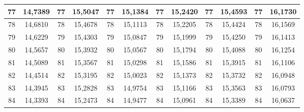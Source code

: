 \documentclass[a4paper,12pt]{article} %
\begin{document}
\begin{longtable}[c]{cccccccccc|c|c|}
	\multicolumn{1}{|c|}{77} & \multicolumn{1}{c|}{14,7389} & \multicolumn{1}{c|}{77} & \multicolumn{1}{c|}{15,5047} & \multicolumn{1}{c|}{77} & \multicolumn{1}{c|}{15,1384} & \multicolumn{1}{c|}{77} & \multicolumn{1}{c|}{15,2420} & \multicolumn{1}{c|}{77} & 15,4593 & 77 & 16,1730 \\ \hline
	\multicolumn{1}{|c|}{78} & \multicolumn{1}{c|}{14,6810} & \multicolumn{1}{c|}{78} & \multicolumn{1}{c|}{15,4678} & \multicolumn{1}{c|}{78} & \multicolumn{1}{c|}{15,1113} & \multicolumn{1}{c|}{78} & \multicolumn{1}{c|}{15,2205} & \multicolumn{1}{c|}{78} & 15,4424 & 78 & 16,1569 \\ \hline
	\multicolumn{1}{|c|}{79} & \multicolumn{1}{c|}{14,6229} & \multicolumn{1}{c|}{79} & \multicolumn{1}{c|}{15,4303} & \multicolumn{1}{c|}{79} & \multicolumn{1}{c|}{15,0847} & \multicolumn{1}{c|}{79} & \multicolumn{1}{c|}{15,1999} & \multicolumn{1}{c|}{79} & 15,4250 & 79 & 16,1413 \\ \hline
	\multicolumn{1}{|c|}{80} & \multicolumn{1}{c|}{14,5657} & \multicolumn{1}{c|}{80} & \multicolumn{1}{c|}{15,3932} & \multicolumn{1}{c|}{80} & \multicolumn{1}{c|}{15,0567} & \multicolumn{1}{c|}{80} & \multicolumn{1}{c|}{15,1794} & \multicolumn{1}{c|}{80} & 15,4088 & 80 & 16,1254 \\ \hline
	\multicolumn{1}{|c|}{81} & \multicolumn{1}{c|}{14,5089} & \multicolumn{1}{c|}{81} & \multicolumn{1}{c|}{15,3567} & \multicolumn{1}{c|}{81} & \multicolumn{1}{c|}{15,0298} & \multicolumn{1}{c|}{81} & \multicolumn{1}{c|}{15,1586} & \multicolumn{1}{c|}{81} & 15,3915 & 81 & 16,1106 \\ \hline
	\multicolumn{1}{|c|}{82} & \multicolumn{1}{c|}{14,4514} & \multicolumn{1}{c|}{82} & \multicolumn{1}{c|}{15,3195} & \multicolumn{1}{c|}{82} & \multicolumn{1}{c|}{15,0023} & \multicolumn{1}{c|}{82} & \multicolumn{1}{c|}{15,1373} & \multicolumn{1}{c|}{82} & 15,3732 & 82 & 16,0948 \\ \hline
	\multicolumn{1}{|c|}{83} & \multicolumn{1}{c|}{14,3945} & \multicolumn{1}{c|}{83} & \multicolumn{1}{c|}{15,2828} & \multicolumn{1}{c|}{83} & \multicolumn{1}{c|}{14,9754} & \multicolumn{1}{c|}{83} & \multicolumn{1}{c|}{15,1166} & \multicolumn{1}{c|}{83} & 15,3563 & 83 & 16,0793 \\ \hline
	\multicolumn{1}{|c|}{84} & \multicolumn{1}{c|}{14,3393} & \multicolumn{1}{c|}{84} & \multicolumn{1}{c|}{15,2473} & \multicolumn{1}{c|}{84} & \multicolumn{1}{c|}{14,9477} & \multicolumn{1}{c|}{84} & \multicolumn{1}{c|}{15,0961} & \multicolumn{1}{c|}{84} & 15,3389 & 84 & 16,0637 \\ \hline

\end{longtable}
\end{document}
